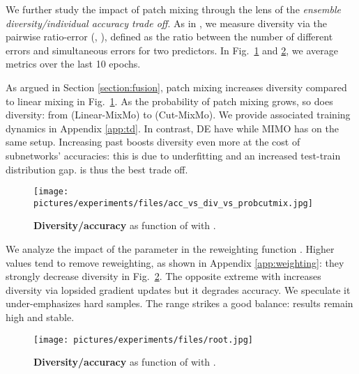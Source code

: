 \documentclass[10pt,twocolumn,letterpaper]{article}
\begin{document}
We further study the impact of patch mixing through the lens of the
\textit{ensemble diversity/individual accuracy trade off}. As in
\cite{rame2021dice}, we measure diversity via the pairwise ratio-error \cite{aksela2003comparison} (, ), defined as the ratio between the number of different errors and simultaneous errors for two predictors. In Fig.~\ref{fig:tradeoff_probcutmix} and \ref{fig:tradeoff_root}, we average metrics over the last 10 epochs.

As argued in Section \ref{section:fusion}, patch mixing increases diversity compared to linear mixing in Fig.~\ref{fig:tradeoff_probcutmix}. As the probability  of patch mixing grows, so does diversity: from  (Linear-MixMo) to  (Cut-MixMo). We provide associated training dynamics in Appendix \ref{app:td}. In contrast, DE have  while MIMO has  on the same setup. Increasing  past  boosts diversity even more at the cost of subnetworks' accuracies: this is due to underfitting and an increased test-train
distribution gap.  is thus the best trade off.\begin{figure}[!h]\centering \texttt{[image: pictures/experiments/files/acc\_vs\_div\_vs\_probcutmix.jpg]}\vspace{-0.5em}\caption{\textbf{Diversity/accuracy} as function of  with .}\label{fig:tradeoff_probcutmix}\vspace{-1em}\end{figure}%
We analyze the impact of the parameter  in the reweighting function .
Higher values tend to remove reweighting, as shown in Appendix \ref{app:weighting}: they
strongly decrease diversity in Fig.~\ref{fig:tradeoff_root}.
The opposite extreme with  increases diversity via lopsided
gradient updates but it degrades accuracy.
We speculate it under-emphasizes hard samples.
The range  strikes a good balance: results remain high and stable.\begin{figure}[!h]\centering \texttt{[image: pictures/experiments/files/root.jpg]}\vspace{-0.5em}\caption{\textbf{Diversity/accuracy} as function of  with .}\vspace{-1em}\label{fig:tradeoff_root}\end{figure}%
\end{document}
